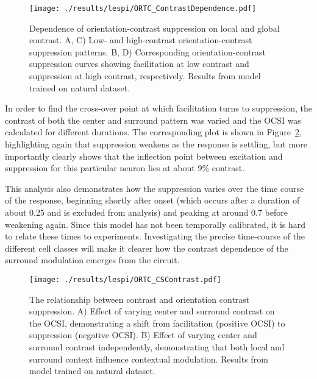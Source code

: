 \begin{figure}
	\centering
        \texttt{[image: ./results/lespi/ORTC\_ContrastDependence.pdf]}
	\caption[Dependence of orientation-contrast suppression on local
      and global contrast.]{Dependence of orientation-contrast
      suppression on local and global contrast. A, C) Low- and
      high-contrast orientation-contrast suppression patterns. B, D)
      Corresponding orientation-contrast suppression curves showing
      facilitation at low contrast and suppression at high contrast,
      respectively. Results from model trained on natural dataset.}
	\label{ORTC_ContrastDependence}
\end{figure}

In order to find the cross-over point at which facilitation turns to
suppression, the contrast of both the center and surround pattern was
varied and the OCSI was calculated for different durations. The
corresponding plot is shown in Figure~\ref{ORTC_ContrastCurve},
highlighting again that suppression weakens as the response is
settling, but more importantly clearly shows that the inflection point between
excitation and suppression for this particular neuron lies at about
9\% contrast.

This analysis also demonstrates how the suppression varies over the
time course of the response, beginning shortly after onset (which
occurs after a duration of about 0.25 and is excluded from analysis)
and peaking at around 0.7 before weakening again. Since this model has
not been temporally calibrated, it is hard to relate these times to
experiments. Investigating the precise time-course of the different
cell classes will make it clearer how the contrast dependence of the
surround modulation emerges from the circuit.

\begin{figure}
	\centering
        \texttt{[image: ./results/lespi/ORTC\_CSContrast.pdf]}
	\caption[Contrast dependent switch from facilitation to
      suppression.]{The relationship between contrast and orientation
      contrast suppression. A) Effect of varying center and surround
      contrast on the OCSI, demonstrating a shift from facilitation
      (positive OCSI) to suppression (negative OCSI). B) Effect of
      varying center and surround contrast independently, demonstrating
      that both local and surround context influence contextual
      modulation. Results from model trained on natural dataset.}
	\label{ORTC_ContrastCurve}
\end{figure}



